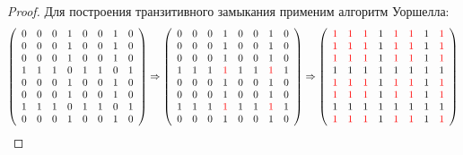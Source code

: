 \begin{proof}
Для построения транзитивного замыкания применим алгоритм Уоршелла:
$$ \left( \begin{array}{cccccccc}
		   0 &0 &0 &1 &0 &0 &1 &0 
        \\0 &0 &0 &1 &0 &0 &1 &0 
        \\0 &0 &0 &1 &0 &0 &1 &0 
        \\1 &1 &1 &0 &1 &1 &0 &1 
        \\0 &0 &0 &1 &0 &0 &1 &0 
        \\0 &0 &0 &1 &0 &0 &1 &0 
        \\1 &1 &1 &0 &1 &1 &0 &1 
        \\0 &0 &0 &1 &0 &0 &1 &0 \end{array} \right) \Rightarrow
    \left( \begin{array}{cccccccc}
		   0 &0 &0 &1 &0 &0 &1 &0 
        \\0 &0 &0 &1 &0 &0 &1 &0 
        \\0 &0 &0 &1 &0 &0 &1 &0 
        \\1 &1 &1 &\textcolor{red}{1} &1 &1 &\textcolor{red}{1} &1 
        \\0 &0 &0 &1 &0 &0 &1 &0 
        \\0 &0 &0 &1 &0 &0 &1 &0 
        \\1 &1 &1 &\textcolor{red}{1} &1 &1 &\textcolor{red}{1} &1 
        \\0 &0 &0 &1 &0 &0 &1 &0 \end{array} \right) \Rightarrow
    \left( \begin{array}{cccccccc}
		   \textcolor{red}{1} &\textcolor{red}{1} &\textcolor{red}{1} &1 &\textcolor{red}{1} &\textcolor{red}{1} &1 &\textcolor{red}{1} 
        \\\textcolor{red}{1} &\textcolor{red}{1} &\textcolor{red}{1} &1 &\textcolor{red}{1} &\textcolor{red}{1} &1 &\textcolor{red}{1} 
        \\\textcolor{red}{1} &\textcolor{red}{1} &\textcolor{red}{1} &1 &\textcolor{red}{1} &\textcolor{red}{1} &1 &\textcolor{red}{1} 
        \\1 &1 &1 &1 &1 &1 &1 &1 
        \\\textcolor{red}{1} &\textcolor{red}{1} &\textcolor{red}{1} &1 &\textcolor{red}{1} &\textcolor{red}{1} &1 &\textcolor{red}{1} 
        \\\textcolor{red}{1} &\textcolor{red}{1} &\textcolor{red}{1} &1 &\textcolor{red}{1} &\textcolor{red}{1} &1 &\textcolor{red}{1} 
        \\1 &1 &1 &1 &1 &1 &1 &1 
        \\\textcolor{red}{1} &\textcolor{red}{1} &\textcolor{red}{1} &1 &\textcolor{red}{1} &\textcolor{red}{1} &1 &\textcolor{red}{1} \end{array} \right)    
        $$
\end{proof}

